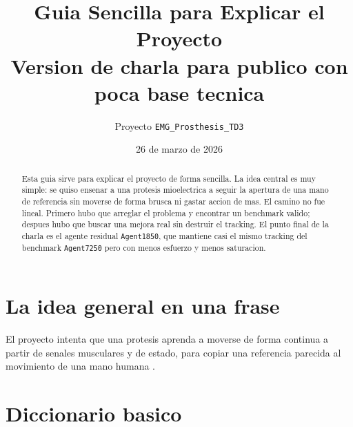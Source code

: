 \documentclass[11pt,a4paper]{article}
\title{\textbf{Guia Sencilla para Explicar el Proyecto}\\
\large Version de charla para publico con poca base tecnica}
\author{Proyecto \texttt{EMG\_Prosthesis\_TD3}}
\date{26 de marzo de 2026}
\begin{document}
\maketitle

\begin{abstract}
Esta guia sirve para explicar el proyecto de forma sencilla. La idea central es muy simple: se quiso ensenar a una protesis mioelectrica a seguir la apertura de una mano de referencia sin moverse de forma brusca ni gastar accion de mas. El camino no fue lineal. Primero hubo que arreglar el problema y encontrar un benchmark valido; despues hubo que buscar una mejora real sin destruir el tracking. El punto final de la charla es el agente residual \texttt{Agent1850}, que mantiene casi el mismo tracking del benchmark \texttt{Agent7250} pero con menos esfuerzo y menos saturacion.
\end{abstract}

\tableofcontents
\newpage

\section{La idea general en una frase}

El proyecto intenta que una protesis aprenda a moverse de forma continua a partir de senales musculares y de estado, para copiar una referencia parecida al movimiento de una mano humana \citep{fuertes2026continuous,chen2023review}.

\section{Diccionario basico}
\end{document}
